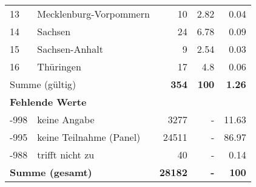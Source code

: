 \begin{longtable}{lXrrr}
     13 &
     \multicolumn{1}{X}{ Mecklenburg-Vorpommern   } &


       \num{10} &
       \num[round-mode=places,round-precision=2]{2,82} &
         \num[round-mode=places,round-precision=2]{0,04} \\

     14 &
     \multicolumn{1}{X}{ Sachsen   } &


       \num{24} &
       \num[round-mode=places,round-precision=2]{6,78} &
         \num[round-mode=places,round-precision=2]{0,09} \\

     15 &
     \multicolumn{1}{X}{ Sachsen-Anhalt   } &


       \num{9} &
       \num[round-mode=places,round-precision=2]{2,54} &
         \num[round-mode=places,round-precision=2]{0,03} \\

     16 &
     \multicolumn{1}{X}{ Thüringen   } &


       \num{17} &
       \num[round-mode=places,round-precision=2]{4,8} &
         \num[round-mode=places,round-precision=2]{0,06} \\
     \midrule
     \multicolumn{2}{l}{Summe (gültig)} &
       \textbf{\num{354}} &
     \textbf{100} &
       \textbf{\num[round-mode=places,round-precision=2]{1,26}} \\
     \multicolumn{5}{l}{\textbf{Fehlende Werte}}\\
       -998 &
       keine Angabe &
         \num{3277} &
        - &
         \num[round-mode=places,round-precision=2]{11,63} \\
       -995 &
       keine Teilnahme (Panel) &
         \num{24511} &
        - &
         \num[round-mode=places,round-precision=2]{86,97} \\
       -988 &
       trifft nicht zu &
         \num{40} &
        - &
         \num[round-mode=places,round-precision=2]{0,14} \\
     \midrule
     \multicolumn{2}{l}{\textbf{Summe (gesamt)}} &
          \textbf{\num{28182}} &
        \textbf{-} &
        \textbf{100} \\
     \bottomrule
     \end{longtable}
     
